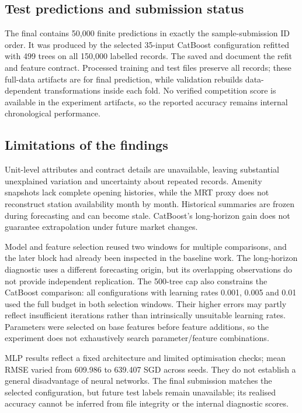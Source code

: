 \documentclass[conference]{IEEEtran}
\newcommand{\field}[1]{\texttt{\detokenize{#1}}}
\begin{document}
\subsection{Test predictions and submission status}
\label{sec:submission}
The final \field{submissions/catboost_improved.csv} contains 50,000 finite
predictions in exactly the sample-submission ID order. It was produced by
the selected 35-input CatBoost configuration refitted with 499 trees on
all 150,000 labelled records. The saved \field{final_refit.json} and
 document the
refit and feature contract. Processed training and test files preserve
all records; these full-data artifacts are for final prediction, while
validation rebuilds data-dependent transformations inside each fold.
No verified competition score is available in the experiment artifacts,
so the reported accuracy remains internal chronological performance.

\subsection{Limitations of the findings}
Unit-level attributes and contract details are unavailable, leaving
substantial unexplained variation and uncertainty about repeated records.
Amenity snapshots lack complete opening histories, while the MRT proxy does
not reconstruct station availability month by month. Historical summaries
are frozen during forecasting and can become stale. CatBoost's long-horizon
gain does not guarantee extrapolation under future market changes.

Model and feature selection reused two windows for multiple comparisons, and
the later block had already been inspected in the baseline work. The
long-horizon diagnostic uses a different forecasting origin, but its
overlapping observations do not provide independent replication. The 500-tree
cap also constrains the CatBoost comparison: all configurations with learning
rates 0.001, 0.005 and 0.01 used the full budget in both selection windows.
Their higher errors may partly reflect insufficient iterations rather than
intrinsically unsuitable learning rates. Parameters were selected on base
features before feature additions, so the experiment does not exhaustively
search parameter/feature combinations.

MLP results reflect a fixed architecture and
limited optimisation checks; mean RMSE varied from 609.986 to 639.407 SGD
across seeds. They do not establish a general disadvantage of neural
networks. The final submission matches the selected configuration, but
future test labels remain unavailable; its realised accuracy cannot be
inferred from file integrity or the internal diagnostic scores.
\end{document}
